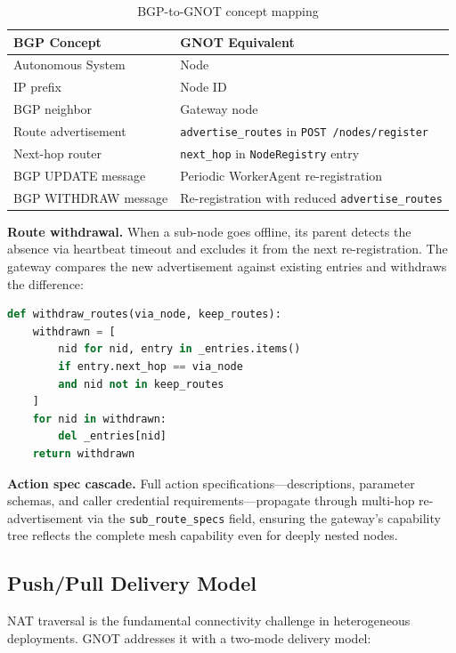 \documentclass[10pt,twocolumn]{article}
\begin{document}
\begin{table}[h]
\centering
\caption{BGP-to-GNOT concept mapping}
\label{tab:bgp}
\small
\begin{tabular}{@{}ll@{}}
\toprule
\textbf{BGP Concept} & \textbf{GNOT Equivalent} \\
\midrule
Autonomous System & Node \\
IP prefix & Node ID \\
BGP neighbor & Gateway node \\
Route advertisement & \texttt{advertise\_routes} in \texttt{POST /nodes/register} \\
Next-hop router & \texttt{next\_hop} in \texttt{NodeRegistry} entry \\
BGP UPDATE message & Periodic WorkerAgent re-registration \\
BGP WITHDRAW message & Re-registration with reduced \texttt{advertise\_routes} \\
\bottomrule
\end{tabular}
\end{table}

\textbf{Route withdrawal.} When a sub-node goes offline, its parent
detects the absence via heartbeat timeout and excludes it from the next
re-registration. The gateway compares the new advertisement against
existing entries and withdraws the difference:

\begin{lstlisting}[language=python, caption={Route withdrawal logic}]
def withdraw_routes(via_node, keep_routes):
    withdrawn = [
        nid for nid, entry in _entries.items()
        if entry.next_hop == via_node
        and nid not in keep_routes
    ]
    for nid in withdrawn:
        del _entries[nid]
    return withdrawn
\end{lstlisting}

\textbf{Action spec cascade.} Full action specifications---descriptions,
parameter schemas, and caller credential requirements---propagate through
multi-hop re-advertisement via the \texttt{sub\_route\_specs} field,
ensuring the gateway's capability tree reflects the complete mesh
capability even for deeply nested nodes.

\subsection{Push/Pull Delivery Model}
\label{sec:pushpull}

NAT traversal is the fundamental connectivity challenge in heterogeneous
deployments. GNOT addresses it with a two-mode delivery model:
\end{document}
